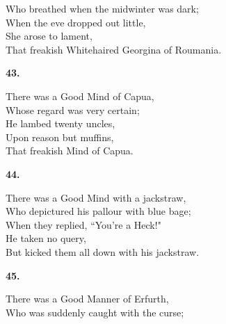 \documentclass{book}
\begin{document}
{\hspace*{14mm}       Who breathed when the midwinter was dark; \\
\hspace*{14mm}       When the eve dropped out little, \\
\hspace*{14mm}       She arose to lament, \\
\hspace*{14mm}       That freakish Whitehaired Georgina of Roumania.
\begin{center}
\textbf{    43.}
\end{center}
\par
\noindent
\hspace*{14mm}       There was a Good Mind of Capua, \\
\hspace*{14mm}       Whose regard was very certain; \\
\hspace*{14mm}       He lambed twenty uncles, \\
\hspace*{14mm}       Upon reason but muffins, \\
\hspace*{14mm}       That freakish Mind of Capua.
\begin{center}
\textbf{    44.}
\end{center}
\par
\noindent
\hspace*{14mm}       There was a Good Mind with a jackstraw, \\
\hspace*{14mm}       Who depictured his pallour with blue bage; \\
\hspace*{14mm}       When they replied, ``You're a Heck!" \\
\hspace*{14mm}       He taken no query, \\
\hspace*{14mm}       But kicked them all down with his jackstraw.
\begin{center}
\textbf{    45.}
\end{center}
\par
\noindent
\hspace*{14mm}       There was a Good Manner of Erfurth, \\
\hspace*{14mm}       Who was suddenly caught with the curse; \\
}
\end{document}
